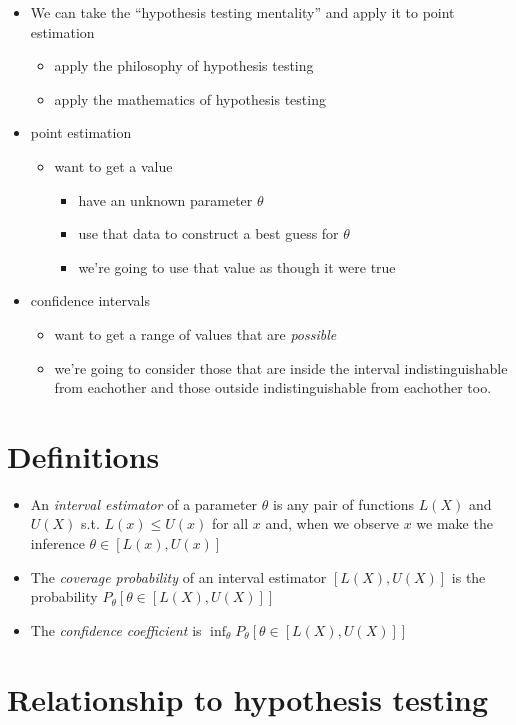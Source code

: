 \begin{itemize}
\item We can take the ``hypothesis testing mentality'' and apply it to
      point estimation
\begin{itemize}
\item apply the philosophy of hypothesis testing
\item apply the mathematics of hypothesis testing
\end{itemize}
\item point estimation
\begin{itemize}
\item want to get a value
\begin{itemize}
\item have an unknown parameter $\theta$
\item use that data to construct a best guess for $\theta$
\item we're going to use that value as though it were true
\end{itemize}
\end{itemize}
\item confidence intervals
\begin{itemize}
\item want to get a range of values that are \emph{possible}
\item we're going to consider those that are inside the interval
        indistinguishable from eachother and those outside
        indistinguishable from eachother too.
\end{itemize}
\end{itemize}
\section{Definitions}
\label{sec-2}

\begin{itemize}
\item An \emph{interval estimator} of a parameter $\theta$ is any pair of
      functions $L(X)$ and $U(X)$ s.t. $L(x) \leq U(x)$ for all $x$
      and, when we observe $x$ we make the inference $\theta \in
      [L(x), U(x)]$
\item The \emph{coverage probability} of an interval estimator
      $[L(X),U(X)]$ is the probability $P_\theta[\theta \in [L(X), U(X)]]$
\item The \emph{confidence coefficient} is $\inf_\theta P_\theta[\theta \in [L(X), U(X)]]$
\end{itemize}
\section{Relationship to hypothesis testing}
\label{sec-3}

